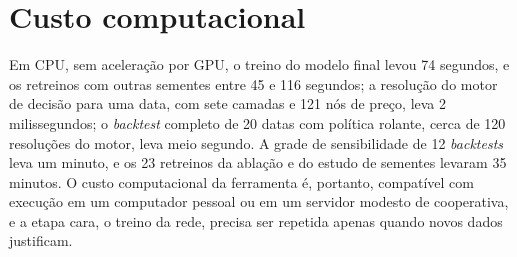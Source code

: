 \section{Custo computacional}\label{sec2:res-custo}

Em CPU, sem aceleração por GPU, o treino do modelo final levou 74 segundos, e os retreinos com outras sementes entre 45 e 116 segundos; a resolução do motor de decisão para uma data, com sete camadas e 121 nós de preço, leva 2 milissegundos; o \textit{backtest} completo de 20 datas com política rolante, cerca de 120 resoluções do motor, leva meio segundo. A grade de sensibilidade de 12 \textit{backtests} leva um minuto, e os 23 retreinos da ablação e do estudo de sementes levaram 35 minutos. O custo computacional da ferramenta é, portanto, compatível com execução em um computador pessoal ou em um servidor modesto de cooperativa, e a etapa cara, o treino da rede, precisa ser repetida apenas quando novos dados justificam.
